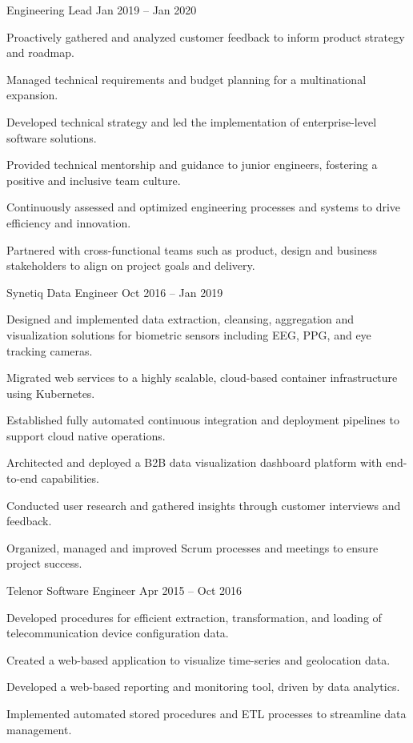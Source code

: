 \documentclass[]{awesome-cv}
\begin{document}
\begin{cventries}
	{Engineering Lead}
	{Jan 2019 – Jan 2020}
	{}
	{\begin{cvitems}
		\item {Proactively gathered and analyzed customer feedback to inform product strategy and roadmap.}
		\item {Managed technical requirements and budget planning for a multinational expansion.}
		\item {Developed technical strategy and led the implementation of enterprise-level software solutions.}
		\item {Provided technical mentorship and guidance to junior engineers, fostering a positive and inclusive team culture.}
		\item {Continuously assessed and optimized engineering processes and systems to drive efficiency and innovation.}
		\item {Partnered with cross-functional teams such as product, design and business stakeholders to align on project goals and delivery.}
		\end{cvitems}}
	\cventry
	{Synetiq}
	{Data Engineer}
	{Oct 2016 – Jan 2019}
	{}
	{\begin{cvitems}
		\item {Designed and implemented data extraction, cleansing, aggregation and visualization solutions for biometric sensors including EEG, PPG, and eye tracking cameras.}
		\item {Migrated web services to a highly scalable, cloud-based container infrastructure using Kubernetes.}
		\item {Established fully automated continuous integration and deployment pipelines to support cloud native operations.}
		\item {Architected and deployed a B2B data visualization dashboard platform with end-to-end capabilities.}
		\item {Conducted user research and gathered insights through customer interviews and feedback.}
		\item {Organized, managed and improved Scrum processes and meetings to ensure project success.}
		\end{cvitems}}
	\cventry
	{Telenor}
	{Software Engineer}
	{Apr 2015 – Oct 2016}
	{}
	{\begin{cvitems}
		\item {Developed procedures for efficient extraction, transformation, and loading of telecommunication device configuration data.}
		\item {Created a web-based application to visualize time-series and geolocation data.}
		\item {Developed a web-based reporting and monitoring tool, driven by data analytics.}
		\item {Implemented automated stored procedures and ETL processes to streamline data management.}
		\end{cvitems}}
\end{cventries}
\end{document}
